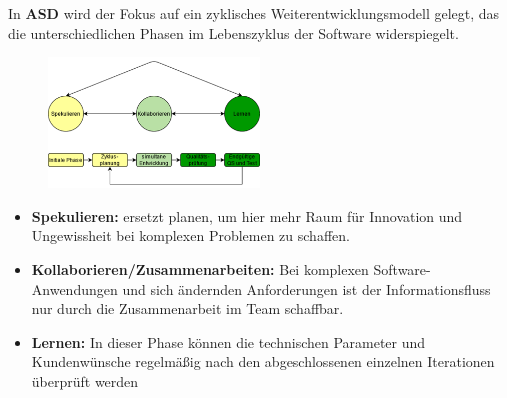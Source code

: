 In \textbf{ASD} wird der Fokus auf ein zyklisches Weiterentwicklungsmodell gelegt, das die unterschiedlichen Phasen im Lebenszyklus der Software widerspiegelt. \cite{Abdelaziz2015-lb}
\begin{figure}
\centering
    \includegraphics[width=0.5\textwidth]{fig/ASD.png}
    \label{fig:title-image}
\end{figure}
\begin{itemize}
    \item \textbf{Spekulieren:} ersetzt planen, um hier mehr Raum für Innovation und Ungewissheit bei komplexen Problemen zu schaffen.
    \item \textbf{Kollaborieren/Zusammenarbeiten:} Bei komplexen Software-Anwendungen und sich ändernden Anforderungen ist der Informationsfluss nur durch die Zusammenarbeit im Team schaffbar.
    \item \textbf{Lernen:} In dieser Phase können die technischen Parameter und Kundenwünsche regelmäßig nach den abgeschlossenen einzelnen Iterationen überprüft werden
\end{itemize}
\cite{Alnoukari2008-ro,Abdelaziz2015-lb}
\newline

